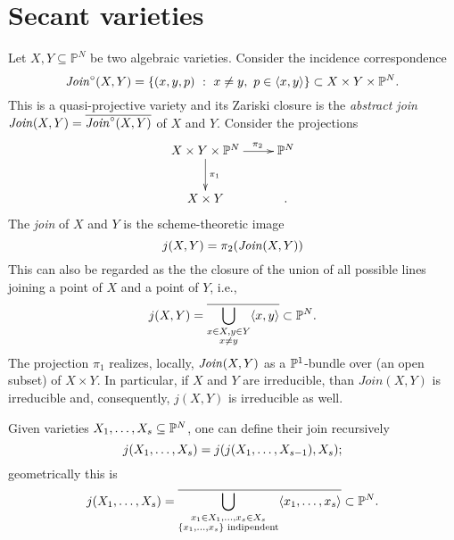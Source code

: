  
\section{Secant varieties}
\label{classicalAG-section-secants}

\begin{definition}
\label{classicalAG-definition-join}
Let $X,Y \subseteq \mathbb{P}^N$ be two algebraic varieties. Consider the incidence correspondence 
\[
    \mathit{Join}^\circ(X,Y) = \{(x,y,p) ~:~ x \neq y,~p \in \langle x,y \rangle\} \subset X \times Y \times \mathbb{P}^N.
\]
This is a quasi-projective variety and its Zariski closure is the {\it abstract join} $\mathit{Join}(X,Y) = \overline{\mathit{Join}^\circ(X,Y)}$ of $X$ and $Y$. Consider the projections 
\[
    \xymatrix{
        X \times Y \times \bbP^N \ar[d]^{\pi_1} \ar[r]^(0.65){\pi_2} & \bbP^N\\
        X \times Y & .
    }
\]
The \emph{join} of $X$ and $Y$ is the scheme-theoretic image 
\[
    j(X,Y) = \pi_2(\mathit{Join}(X,Y))
\]
This can also be regarded as the the closure of the union of all possible lines joining a point of $X$ and a point of $Y$, i.e.,
\[
    j(X,Y) = \overline{ \bigcup_{\substack{x \in X, y \in Y \\ x \neq y}} \langle x,y \rangle} \subset \mathbb{P}^N.
\]
The projection $\pi_1$ realizes, locally, $\mathit{Join}(X,Y)$ as a $\mathbb{P}^1$-bundle over (an open subset) of $X \times Y$. In particular, if $X$ and $Y$ are irreducible, than $Join(X,Y)$ is irreducible and, consequently, $j(X,Y)$ is irreducible as well.

Given varieties $X_1 , \ldots , X_s \subseteq \mathbb{P}^N$, one can define their join recursively
\[
    j( X_1 , \ldots , X_s) = j( j(X_1 , \ldots , X_{s-1}), X_s);
\]
geometrically this is 
\[
    j( X_1 , \ldots , X_s) = \overline{\bigcup_{\substack{x_1 \in X_1,\ldots,x_s \in X_s \\ \{x_1,\ldots,x_s\} \text{ indipendent}}} \langle x_1,\ldots,x_s \rangle} \subset \mathbb{P}^N.
\]
\end{definition}

